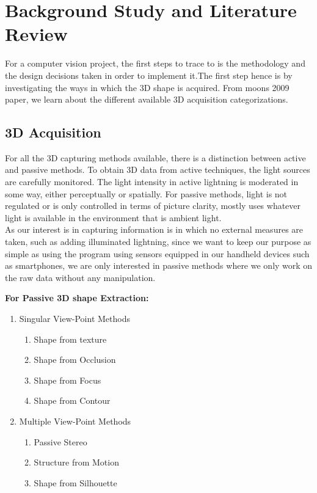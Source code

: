 \documentclass[a4paper]{report}
\begin{document}
\chapter{Background Study and Literature Review}

For a computer vision project, the first steps to trace to is the methodology and the design decisions taken in order to implement it.The first step hence is by investigating the ways in which the 3D shape  is acquired.  From moons 2009 paper, we learn about the different available 3D acquisition categorizations.
\section{3D Acquisition}
For all the 3D capturing methods available, there is a distinction between active and passive methods. To obtain 3D data from active techniques, the light sources are carefully monitored. The light intensity in active lightning is moderated in some way, either perceptually or spatially. For passive methods, light is not regulated or is only controlled in terms of picture clarity, mostly uses whatever light is available in the environment that is ambient light.
\\
As our interest is in capturing information is in which no external measures are taken, such as adding illuminated lightning, since we want to keep our purpose as simple as using the program using  sensors equipped in our handheld devices such as smartphones, we are only interested in passive methods where we only work on the raw data without any manipulation.
\\
\begin{center}
\textbf{For Passive 3D shape Extraction:}
\begin{enumerate}
\item Singular View-Point Methods
 \begin{enumerate}
 \item Shape from texture
 \item Shape from Occlusion
 \item Shape from Focus
 \item Shape from Contour
 \end{enumerate}
 
 \item Multiple View-Point Methods
 \begin{enumerate}
 \item Passive Stereo
 \item Structure from Motion
 \item Shape from Silhouette

 \end{enumerate}
\end{enumerate}

\end{center}
\end{document}
